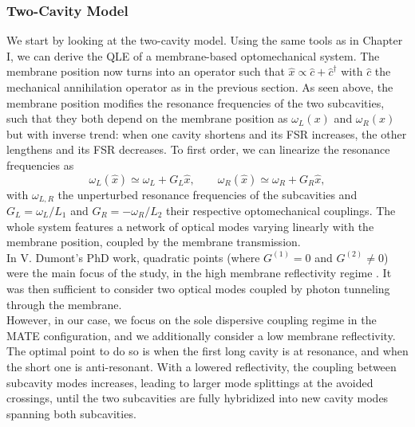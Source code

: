 \subsubsection{Two-Cavity Model}
We start by looking at the two-cavity model. Using the same tools as in Chapter I, we can derive the QLE of a membrane-based optomechanical system. The membrane position now turns into an operator such that $\hat x \propto \hat c + \hat c^{\dagger} $ with $\hat c$ the mechanical annihilation operator as in the previous section. As seen above, the membrane position modifies the resonance frequencies of the two subcavities, such that they both depend on the membrane position as \(\omega_L(x)\) and \(\omega_R(x)\) but with inverse trend: when one cavity shortens and its FSR increases, the other lengthens and its FSR decreases. To first order, we can linearize the resonance frequencies as
\begin{equation}
\omega_L(\hat x) \simeq \omega_{L} + G_L \hat x, \qquad \omega_R(\hat x) \simeq \omega_{R} + G_R \hat x,
\end{equation}
with \(\omega_{L,R}\) the unperturbed resonance frequencies of the subcavities and \(G_L = \omega_{L}/L_1\) and \(G_R = - \omega_{R}/L_2\) their respective optomechanical couplings. 
The whole system features a network of optical modes varying linearly with the membrane position, coupled by the membrane transmission. \\ 

In V. Dumont's PhD work, quadratic points (where \(G^{(1)} = 0\) and \(G^{(2)} \neq 0\)) were the main focus of the study, in the high membrane reflectivity regime \cite{dumont_quantum_2022}. It was then sufficient to consider two optical modes coupled by photon tunneling through the membrane. \\ 

However, in our case, we focus on the sole dispersive coupling regime in the MATE configuration, and we additionally consider a low membrane reflectivity. The optimal point to do so is when the first long cavity is at resonance, and when the short one is anti-resonant. With a lowered reflectivity, the coupling between subcavity modes increases, leading to larger mode splittings at the avoided crossings, until the two subcavities are fully hybridized into new cavity modes spanning both subcavities. \\ 


